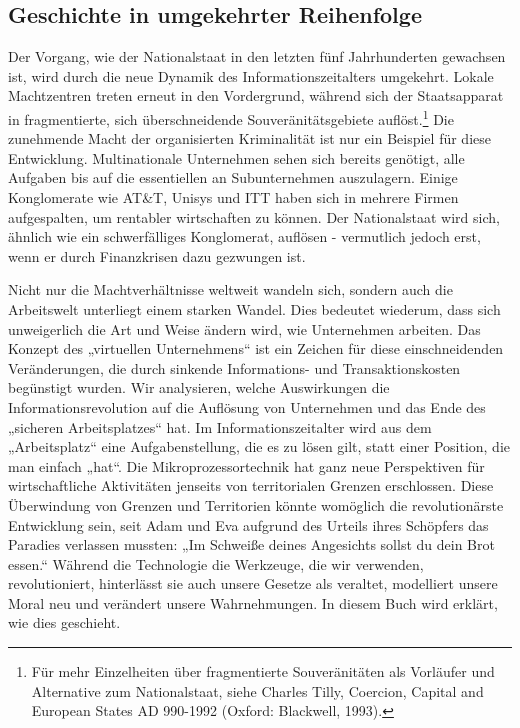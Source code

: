 \documentclass[
  a5paper,
  smalldemyvopaper,10pt,twoside,onecolumn,openright,extrafontsizes,hidelinks]{memoir}
\begin{document}
\subsection{Geschichte in umgekehrter
Reihenfolge}\label{geschichte-in-umgekehrter-reihenfolge}

Der Vorgang, wie der Nationalstaat in den letzten fünf Jahrhunderten
gewachsen ist, wird durch die neue Dynamik des Informationszeitalters
umgekehrt. Lokale Machtzentren treten erneut in den Vordergrund, während
sich der Staatsapparat in fragmentierte, sich überschneidende
Souveränitätsgebiete auflöst.\footnote{Für mehr Einzelheiten über
  fragmentierte Souveränitäten als Vorläufer und Alternative zum
  Nationalstaat, siehe Charles Tilly, Coercion, Capital and European
  States AD 990-1992 (Oxford: Blackwell, 1993).} Die zunehmende Macht
der organisierten Kriminalität ist nur ein Beispiel für diese
Entwicklung. Multinationale Unternehmen sehen sich bereits genötigt,
alle Aufgaben bis auf die essentiellen an Subunternehmen auszulagern.
Einige Konglomerate wie AT\&T, Unisys und ITT haben sich in mehrere
Firmen aufgespalten, um rentabler wirtschaften zu können. Der
Nationalstaat wird sich, ähnlich wie ein schwerfälliges Konglomerat,
auflösen - vermutlich jedoch erst, wenn er durch Finanzkrisen dazu
gezwungen ist.

Nicht nur die Machtverhältnisse weltweit wandeln sich, sondern auch die
Arbeitswelt unterliegt einem starken Wandel. Dies bedeutet wiederum,
dass sich unweigerlich die Art und Weise ändern wird, wie Unternehmen
arbeiten. Das Konzept des „virtuellen Unternehmens`` ist ein Zeichen für
diese einschneidenden Veränderungen, die durch sinkende Informations-
und Transaktionskosten begünstigt wurden. Wir analysieren, welche
Auswirkungen die Informationsrevolution auf die Auflösung von
Unternehmen und das Ende des „sicheren Arbeitsplatzes`` hat. Im
Informationszeitalter wird aus dem „Arbeitsplatz`` eine
Aufgabenstellung, die es zu lösen gilt, statt einer Position, die man
einfach „hat``. Die Mikroprozessortechnik hat ganz neue Perspektiven für
wirtschaftliche Aktivitäten jenseits von territorialen Grenzen
erschlossen. Diese Überwindung von Grenzen und Territorien könnte
womöglich die revolutionärste Entwicklung sein, seit Adam und Eva
aufgrund des Urteils ihres Schöpfers das Paradies verlassen mussten: „Im
Schweiße deines Angesichts sollst du dein Brot essen.`` Während die
Technologie die Werkzeuge, die wir verwenden, revolutioniert,
hinterlässt sie auch unsere Gesetze als veraltet, modelliert unsere
Moral neu und verändert unsere Wahrnehmungen. In diesem Buch wird
erklärt, wie dies geschieht.
\end{document}
